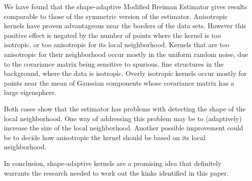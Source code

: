 
We have found that the shape-adaptive Modified Breiman Estimator gives results comparable to those of the symmetric version of the estimator.
Anisotropic kernels have proven advantageous near the borders of the data sets. However this positive effect is negated by the number of points where the kernel is too isotropic, or too anisotropic for its local neighborhood. 
	Kernels that are too anisotropic for their neighborhood occur mostly in the uniform random noise, due to the covariance matrix being sensitive to spurious, fine structures in the background, where the data is isotropic. 
	Overly isotropic kernels occur mostly for points near the mean of Gaussian components whose covariance matrix has a large eigensphere. 

Both cases show that the estimator has problems with detecting the shape of the local neighborhood. One way of addressing this problem may be to (adaptively) increase the size of the local neighborhood. Another possible improvement could be to decide how anisotropic the kernel should be based on its local neighborhood.

In conclusion, shape-adaptive kernels are a promising idea that definitely warrants the research needed to work out the kinks identified in this paper.